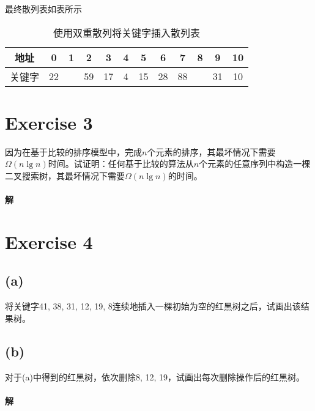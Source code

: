 \documentclass{article}
\begin{document}
最终散列表如表所示
\begin{table}[H]
    \centering
    \begin{tabular}{|c|c|c|c|c|c|c|c|c|c|c|c|}
    \hline
    地址 & 0 & 1 & 2 & 3 & 4 & 5 & 6 & 7 & 8 & 9 & 10 \\ \hline
    关键字 & 22 &  & 59 & 17 & 4 & 15 & 28 & 88 &  & 31 & 10 \\ \hline
    \end{tabular}
    \caption{使用双重散列将关键字插入散列表}
\end{table}

\section*{Exercise 3}
因为在基于比较的排序模型中，完成$n$个元素的排序，其最坏情况下需要$\Omega(n \lg{n})$时间。试证明：任何基于比较的算法从$n$个元素的任意序列中构造一棵二叉搜索树，其最坏情况下需要$\Omega(n \lg{n})$的时间。

\paragraph{解}

\section*{Exercise 4}
\subsection*{(a)}
将关键字41, 38, 31, 12, 19, 8连续地插入一棵初始为空的红黑树之后，试画出该结果树。
\subsection*{(b)}
对于(a)中得到的红黑树，依次删除8, 12, 19，试画出每次删除操作后的红黑树。
\paragraph{解}
\end{document}
